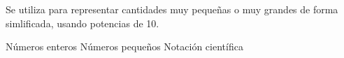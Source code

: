 
\question Se utiliza para representar cantidades muy pequeñas o muy grandes
          de forma simlificada, usando potencias de 10.

  \begin{oneparchoices}
    \choice Números enteros
    \choice Números pequeños
    \CorrectChoice Notación científica
  \end{oneparchoices}
